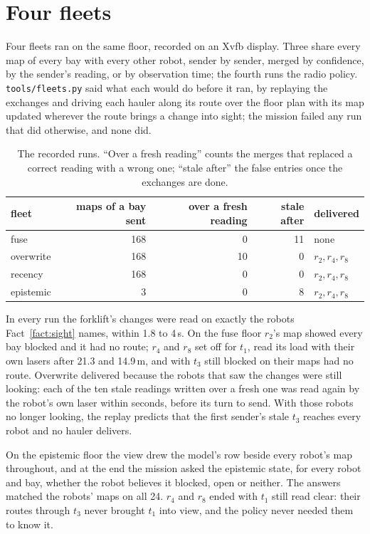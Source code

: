\documentclass[11pt,a4paper]{article}
\theoremstyle{definition}
\newcommand{\code}[1]{\texttt{\small #1}}
\begin{document}
\section{Four fleets}
\label{sec:runs}

Four fleets ran on the same floor, recorded on an Xvfb display. Three share every
map of every bay with every other robot, sender by sender, merged by confidence,
by the sender's reading, or by observation time; the fourth runs the radio
policy. \code{tools/fleets.py} said what each would do before it ran, by
replaying the exchanges and driving each hauler along its route over the floor
plan with its map updated wherever the route brings a change into sight; the
mission failed any run that did otherwise, and none did.

\begin{table}[H]
\centering\small
\begin{tabular}{@{}l r r r l@{}}
\toprule
fleet & maps of a bay sent & over a fresh reading & stale after & delivered \\
\midrule
fuse & 168 & 0 & 11 & none \\
overwrite & 168 & 10 & 0 & $r_2, r_4, r_8$ \\
recency & 168 & 0 & 0 & $r_2, r_4, r_8$ \\
epistemic & 3 & 0 & 8 & $r_2, r_4, r_8$ \\
\bottomrule
\end{tabular}
\caption{The recorded runs. ``Over a fresh reading'' counts the merges that
replaced a correct reading with a wrong one; ``stale after'' the false entries
once the exchanges are done.}
\label{tab:runs}
\end{table}

In every run the forklift's changes were read on exactly the robots
Fact~\ref{fact:sight} names, within 1.8 to 4\,s. On the fuse floor $r_2$'s map
showed every bay blocked and it had no route; $r_4$ and $r_8$ set off for $t_1$,
read its load with their own lasers after 21.3 and 14.9\,m, and with $t_3$ still
blocked on their maps had no route. Overwrite delivered because the robots that
saw the changes were still looking: each of the ten stale readings written over a
fresh one was read again by the robot's own laser within seconds, before its
turn to send. With those robots no longer looking, the replay predicts that the
first sender's stale $t_3$ reaches every robot and no hauler delivers.

On the epistemic floor the view drew the model's row beside every robot's map
throughout, and at the end the mission asked the epistemic state, for every
robot and bay, whether the robot believes it blocked, open or neither. The
answers matched the robots' maps on all 24. $r_4$ and $r_8$ ended with $t_1$
still read clear: their routes through $t_3$ never brought $t_1$ into view, and
the policy never needed them to know it.
\end{document}
